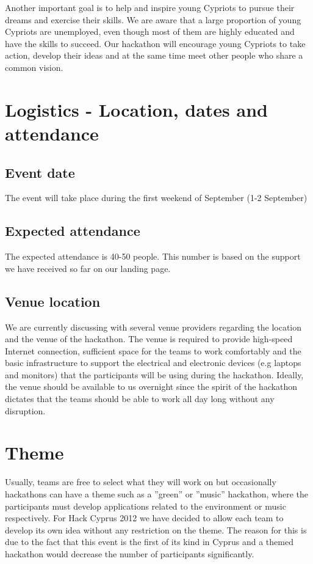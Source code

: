\documentclass[a4paper,11pt]{report}
\begin{document}
Another important goal is to help and inspire young Cypriots to pursue their dreams and exercise their skills. We are aware that a large proportion of young Cypriots are unemployed, even though most of them are highly educated and have the skills to succeed. Our hackathon will encourage young Cypriots to take action, develop their ideas and at the same time meet other people who share a common vision. 

\section{Logistics - Location, dates and attendance}
\subsection{Event date}
The event will take place during the first weekend of September (1-2 September) 
\subsection{Expected attendance}
The expected attendance is 40-50 people. This number is based on the support we have received so far on our landing page.
\subsection{Venue location}
We are currently discussing with several venue providers regarding the location and the venue of the hackathon. The venue is required to provide high-speed Internet connection, sufficient space for the teams to work comfortably and the basic infrastructure to support the electrical and electronic devices (e.g laptops and monitors) that the participants will be using during the hackathon. Ideally, the venue should be available to us overnight since the spirit of the hackathon dictates that the teams should be able to work all day long without any disruption. 
 
\section{Theme}
Usually, teams are free to select what they will work on but occasionally hackathons can have a theme such as a ''green'' or ''music'' hackathon, where the participants must develop applications related to the environment or music respectively. For Hack Cyprus 2012 we have decided to allow each team to develop its own idea without any restriction on the theme. The reason for this is due to the fact that this event is the first of its kind in Cyprus and a themed hackathon would decrease the number of participants significantly. 
\end{document}
